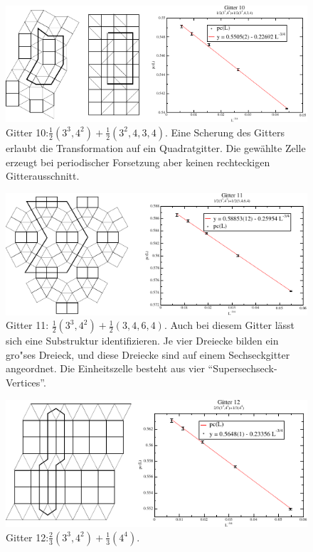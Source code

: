 \begin{figure}[p]
  \includegraphics{./Numerik-figs/2-uni-10_fig}
  \caption{Gitter 10:$\frac{1}{2}(3^3,4^2)+\frac{1}{2}(3^2,4,3,4)$. Eine Scherung des Gitters erlaubt die Transformation auf ein Quadratgitter. Die gew\"ahlte Zelle erzeugt bei periodischer Forsetzung aber keinen rechteckigen Gitterausschnitt.}
\label{fig:appgitter10}
\end{figure}
\clearpage
\begin{figure}[p]
  \includegraphics{./Numerik-figs/2-uni-11_fig}
  \caption{Gitter 11:  $\frac{1}{2}(3^3,4^2)+\frac{1}{2}(3,4,6,4)$. Auch bei diesem Gitter l\"asst sich eine Substruktur identifizieren. Je vier Dreiecke bilden ein gro"ses Dreieck, und diese Dreiecke sind auf einem Sechseckgitter angeordnet. Die Einheitszelle besteht aus vier ``Supersechseck-Vertices''.}
\end{figure}
\begin{figure}[p]
  \includegraphics{./Numerik-figs/2-uni-12_fig}
  \caption{Gitter 12:$\frac{2}{3}(3^3,4^2)+\frac{1}{3}(4^4)$. }
\end{figure}
